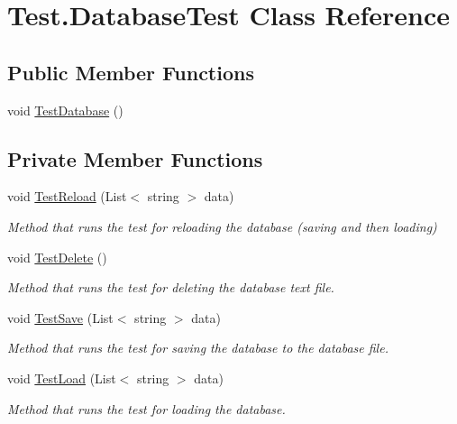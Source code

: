 \hypertarget{class_test_1_1_database_test}{}\section{Test.\+Database\+Test Class Reference}
\label{class_test_1_1_database_test}
\subsection*{Public Member Functions}
\begin{DoxyCompactItemize}
\item 
void \hyperlink{class_test_1_1_database_test_acdb1eec7534df7d2402a5f9974c1dedb}{Test\+Database} ()
\end{DoxyCompactItemize}
\subsection*{Private Member Functions}
\begin{DoxyCompactItemize}
\item 
void \hyperlink{class_test_1_1_database_test_a79dd4fbd1d869f923ce7bfb014bd19e6}{Test\+Reload} (List$<$ string $>$ data)
\begin{DoxyCompactList}\small\item\em Method that runs the test for reloading the database (saving and then loading) \end{DoxyCompactList}\item 
void \hyperlink{class_test_1_1_database_test_aabb3a05be18ca02c9fc9ea000d0493fe}{Test\+Delete} ()
\begin{DoxyCompactList}\small\item\em Method that runs the test for deleting the database text file. \end{DoxyCompactList}\item 
void \hyperlink{class_test_1_1_database_test_a48a140dd5ca0512742e30084340df68a}{Test\+Save} (List$<$ string $>$ data)
\begin{DoxyCompactList}\small\item\em Method that runs the test for saving the database to the database file. \end{DoxyCompactList}\item 
void \hyperlink{class_test_1_1_database_test_ae61f63ded633922ab6d41b175f62869b}{Test\+Load} (List$<$ string $>$ data)
\begin{DoxyCompactList}\small\item\em Method that runs the test for loading the database. \end{DoxyCompactList}\end{DoxyCompactItemize}


